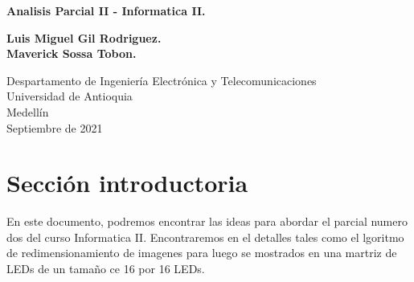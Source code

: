 \documentclass{article}
\begin{document}
\begin{titlepage}
    \begin{center}
        \vspace*{1cm}
            
        \Huge
        \textbf{Analisis Parcial II - Informatica II.}
            
        \vspace{0.5cm}
        \LARGE
            
        \vspace{1.5cm}
            
        \textbf{Luis Miguel Gil Rodriguez.}
        \\
        \textbf{Maverick Sossa Tobon.}
        \vfill
        \vspace{0.8cm}
            
        \Large
        Despartamento de Ingeniería Electrónica y Telecomunicaciones\\
        Universidad de Antioquia\\
        Medellín\\
        Septiembre de 2021
            
    \end{center}
\end{titlepage}
\tableofcontents
\newpage
\section{Sección introductoria} \label{intro}
En este documento, podremos encontrar las ideas para abordar el parcial numero dos del curso Informatica II. Encontraremos en el detalles tales como el lgoritmo de redimensionamiento de imagenes para luego se mostrados en una martriz de LEDs de un tamaño ce 16 por 16 LEDs.
\end{document}
